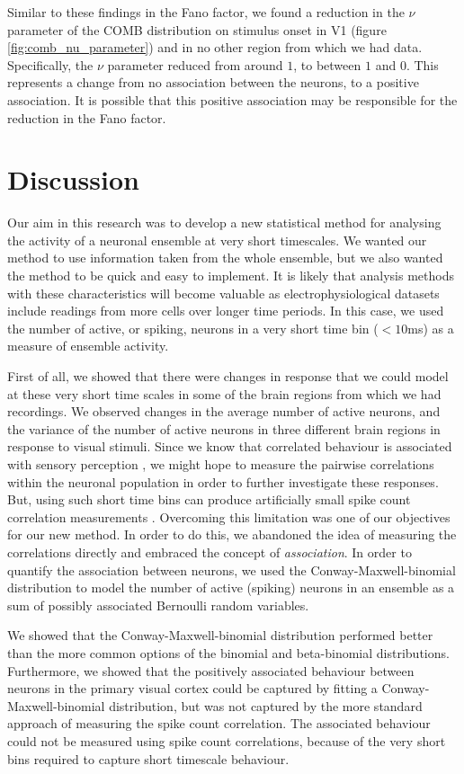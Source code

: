   Similar to these findings in the Fano factor, we found a reduction in the $\nu$ parameter of the COMB distribution on stimulus onset in V1 (figure \ref{fig:comb_nu_parameter}) and in no other region from which we had data. Specifically, the $\nu$ parameter reduced from around $1$, to between $1$ and $0$. This represents a change from no association between the neurons, to a positive association. It is possible that this positive association may be responsible for the reduction in the Fano factor.

\section{Discussion}
Our aim in this research was to develop a new statistical method for analysing the activity of a neuronal ensemble at very short timescales. We wanted our method to use information taken from the whole ensemble, but we also wanted the method to be quick and easy to implement. It is likely that analysis methods with these characteristics will become valuable as electrophysiological datasets include readings from more cells over longer time periods. In this case, we used the number of active, or spiking, neurons in a very short time bin ($<10$ms) as a measure of ensemble activity.

First of all, we showed that there were changes in response that we could model at these very short time scales in some of the brain regions from which we had recordings. We observed changes in the average number of active neurons, and the variance of the number of active neurons in three different brain regions in response to visual stimuli. Since we know that correlated behaviour is associated with sensory perception \parencite{decharms}, we might hope to measure the pairwise correlations within the neuronal population in order to further investigate these responses. But, using such short time bins can produce artificially small spike count correlation measurements \parencite{cohen}. Overcoming this limitation was one of our objectives for our new method. In order to do this, we abandoned the idea of measuring the correlations directly and embraced the concept of \textit{association}. In order to quantify the association between neurons, we used the Conway-Maxwell-binomial distribution to model the number of active (spiking) neurons in an ensemble as a sum of possibly associated Bernoulli random variables.

We showed that the Conway-Maxwell-binomial distribution performed better than the more common options of the binomial and beta-binomial distributions. Furthermore, we showed that the positively associated behaviour between neurons in the primary visual cortex could be captured by fitting a Conway-Maxwell-binomial distribution, but was not captured by the more standard approach of measuring the spike count correlation. The associated behaviour could not be measured using spike count correlations, because of the very short bins required to capture short timescale behaviour.

